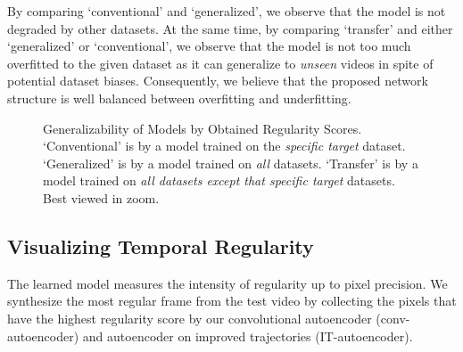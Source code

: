 \documentclass[10pt,twocolumn,letterpaper]{article}
\begin{document}
By comparing `conventional' and `generalized', we observe that the model is not degraded by other datasets.
At the same time, by comparing `transfer' and either `generalized' or `conventional', we observe that the model is not too much overfitted to the given dataset as it can generalize to \emph{unseen} videos in spite of potential dataset biases.
Consequently, we believe that the proposed network structure is well balanced between overfitting and underfitting.

\begin{figure}[h]
	\centering
	\hspace{-1.5em}
	\caption{Generalizability of Models by Obtained Regularity Scores. `Conventional' is by a model trained on the \emph{specific target} dataset. `Generalized' is by a model trained on \emph{all} datasets. `Transfer' is by a model trained on \emph{all datasets except that specific target} datasets. Best viewed in zoom.}
	\label{fig:gen}
	\vspace{-1em}
\end{figure}


\subsection{Visualizing Temporal Regularity}

The learned model measures the intensity of regularity up to pixel precision. We synthesize the most regular frame from the test video by collecting the pixels that have the highest regularity score by our convolutional autoencoder (conv-autoencoder) and autoencoder on improved trajectories (IT-autoencoder).
\end{document}
